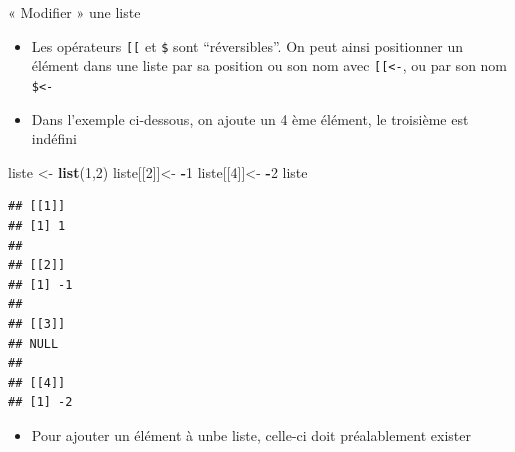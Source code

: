 \documentclass[
  ignorenonframetext,
]{beamer}
\newenvironment{Shaded}{\begin{snugshade}}{\end{snugshade}}
\newcommand{\DecValTok}[1]{\textcolor[rgb]{0.00,0.00,0.81}{#1}}
\newcommand{\FunctionTok}[1]{\textcolor[rgb]{0.13,0.29,0.53}{\textbf{#1}}}
\newcommand{\NormalTok}[1]{#1}
\newcommand{\OtherTok}[1]{\textcolor[rgb]{0.56,0.35,0.01}{#1}}
\newcommand{\SpecialCharTok}[1]{\textcolor[rgb]{0.81,0.36,0.00}{\textbf{#1}}}
\providecommand{\tightlist}{%
  \setlength{\itemsep}{0pt}\setlength{\parskip}{0pt}}
\begin{document}
\begin{frame}[fragile]{« Modifier » une liste}
\protect\hypertarget{modifier-une-liste}{}
\begin{itemize}
\tightlist
\item
  Les opérateurs \texttt{{[}{[}} et \texttt{\$} sont ``réversibles''. On
  peut ainsi positionner un élément dans une liste par sa position ou
  son nom avec \texttt{{[}{[}\textless{}-}, ou par son nom
  \texttt{\$\textless{}-}
\item
  Dans l'exemple ci-dessous, on ajoute un 4 ème élément, le troisième
  est indéfini
\end{itemize}

\tiny

\begin{Shaded}
\begin{Highlighting}[]
\NormalTok{liste }\OtherTok{\textless{}{-}} \FunctionTok{list}\NormalTok{(}\DecValTok{1}\NormalTok{,}\DecValTok{2}\NormalTok{)}
\NormalTok{liste[[}\DecValTok{2}\NormalTok{]]}\OtherTok{\textless{}{-}} \SpecialCharTok{{-}}\DecValTok{1}
\NormalTok{liste[[}\DecValTok{4}\NormalTok{]]}\OtherTok{\textless{}{-}} \SpecialCharTok{{-}}\DecValTok{2}
\NormalTok{liste}
\end{Highlighting}
\end{Shaded}

\begin{verbatim}
## [[1]]
## [1] 1
## 
## [[2]]
## [1] -1
## 
## [[3]]
## NULL
## 
## [[4]]
## [1] -2
\end{verbatim}

\normalsize

\begin{itemize}
\tightlist
\item
  Pour ajouter un élément à unbe liste, celle-ci doit préalablement
  exister
\end{itemize}

\tiny

\begin{Shaded}
\end{Shaded}

\normalsize
\end{frame}
\end{document}
